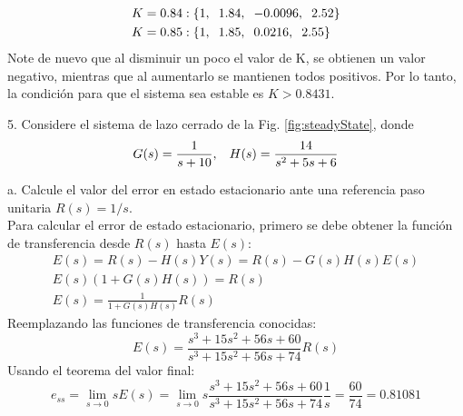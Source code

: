 \documentclass[11pt, spanish]{article}
\begin{document}
\begin{description}
\begin{align*}
				K &= 0.84: \{1,\hspace*{2mm} 1.84,\hspace*{2mm} -0.0096,\hspace*{2mm} 2.52\}\\
				K &= 0.85: \{1,\hspace*{2mm} 1.85,\hspace*{2mm} 0.0216,\hspace*{2mm} 2.55\}
			\end{align*}
			Note de nuevo que al disminuir un poco el valor de K, se obtienen un valor negativo, mientras que al aumentarlo se mantienen todos positivos. Por lo tanto, la condición para que el sistema sea estable es $K > 0.8431$.


			\item 5. Considere el sistema de lazo cerrado de la Fig. \ref{fig:steadyState}, donde
			\begin{equation*}
				G(s) = \frac{1}{s+10}, \hspace*{3mm} H(s) = \frac{14}{s^2+5s+6}
			\end{equation*}
			\begin{description}
				\item a. Calcule el valor del error en estado estacionario ante una referencia paso unitaria $R(s) = 1/s$.\\
				Para calcular el error de estado estacionario, primero se debe obtener la función de transferencia desde $R(s)$ hasta $E(s)$:
				\begin{align*}
					E(s) = R(s) - H(s)Y(s) = R(s) - G(s)H(s)E(s)\\
					E(s)\left( 1 + G(s)H(s) \right) = R(s)\\
					E(s) = \frac{1}{1+G(s)H(s)}R(s)
				\end{align*}
				Reemplazando las funciones de transferencia conocidas:
				\begin{equation*}
					E(s) = \frac{s^3+15s^2+56s+60}{s^3+15s^2+56s+74}R(s)
				\end{equation*}
				Usando el teorema del valor final:
				\begin{equation*}
					e_{ss} = \lim_{s \rightarrow 0}sE(s) = \lim_{s \rightarrow 0} s \frac{s^3+15s^2+56s+60}{s^3+15s^2+56s+74}\frac{1}{s} = \frac{60}{74} = 0.81081
				\end{equation*}


\end{description}
\end{description}
\end{document}
